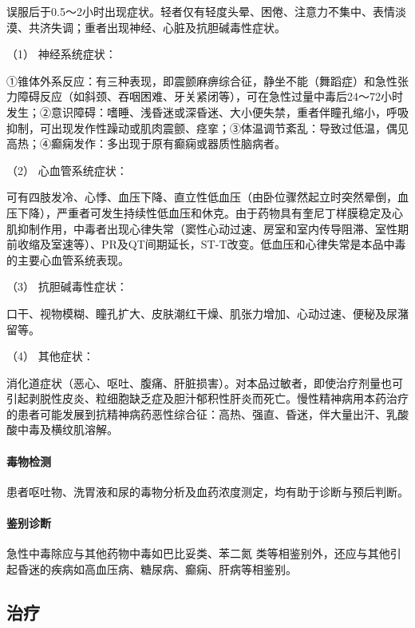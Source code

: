 误服后于0.5～2小时出现症状。轻者仅有轻度头晕、困倦、注意力不集中、表情淡漠、共济失调；重者出现神经、心脏及抗胆碱毒性症状。

\hypertarget{text00133.htmlux5cux23CHP5-2-3-6-2-1}{}
（1） 神经系统症状：

①锥体外系反应：有三种表现，即震颤麻痹综合征，静坐不能（舞蹈症）和急性张力障碍反应（如斜颈、吞咽困难、牙关紧闭等），可在急性过量中毒后24～72小时发生；②意识障碍：嗜睡、浅昏迷或深昏迷、大小便失禁，重者伴瞳孔缩小，呼吸抑制，可出现发作性躁动或肌肉震颤、痉挛；③体温调节紊乱：导致过低温，偶见高热；④癫痫发作：多出现于原有癫痫或器质性脑病者。

\hypertarget{text00133.htmlux5cux23CHP5-2-3-6-2-2}{}
（2） 心血管系统症状：

可有四肢发冷、心悸、血压下降、直立性低血压（由卧位骤然起立时突然晕倒，血压下降），严重者可发生持续性低血压和休克。由于药物具有奎尼丁样膜稳定及心肌抑制作用，中毒者出现心律失常（窦性心动过速、房室和室内传导阻滞、室性期前收缩及室速等）、PR及QT间期延长，ST-T改变。低血压和心律失常是本品中毒的主要心血管系统表现。

\hypertarget{text00133.htmlux5cux23CHP5-2-3-6-2-3}{}
（3） 抗胆碱毒性症状：

口干、视物模糊、瞳孔扩大、皮肤潮红干燥、肌张力增加、心动过速、便秘及尿潴留等。

\hypertarget{text00133.htmlux5cux23CHP5-2-3-6-2-4}{}
（4） 其他症状：

消化道症状（恶心、呕吐、腹痛、肝脏损害）。对本品过敏者，即使治疗剂量也可引起剥脱性皮炎、粒细胞缺乏症及胆汁郁积性肝炎而死亡。慢性精神病用本药治疗的患者可能发展到抗精神病药恶性综合征：高热、强直、昏迷，伴大量出汗、乳酸酸中毒及横纹肌溶解。

\paragraph{毒物检测}

患者呕吐物、洗胃液和尿的毒物分析及血药浓度测定，均有助于诊断与预后判断。

\paragraph{鉴别诊断}

急性中毒除应与其他药物中毒如巴比妥类、苯二氮{}
类等相鉴别外，还应与其他引起昏迷的疾病如高血压病、糖尿病、癫痫、肝病等相鉴别。

\subsection{治疗}

